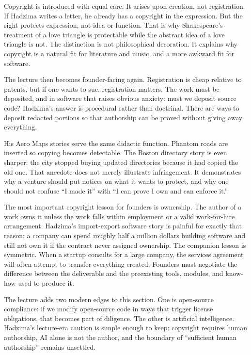 Copyright is introduced with equal care. It arises upon creation, not registration. If Hadzima writes a letter, he already has a copyright in the expression. But the right protects expression, not idea or function. That is why Shakespeare's treatment of a love triangle is protectable while the abstract idea of a love triangle is not. The distinction is not philosophical decoration. It explains why copyright is a natural fit for literature and music, and a more awkward fit for software.

The lecture then becomes founder-facing again. Registration is cheap relative to patents, but if one wants to sue, registration matters. The work must be deposited, and in software that raises obvious anxiety: must we deposit source code? Hadzima's answer is procedural rather than doctrinal. There are ways to deposit redacted portions so that authorship can be proved without giving away everything.

His Aero Maps stories serve the same didactic function. Phantom roads are inserted so copying becomes detectable. The Boston directory story is even sharper: the city stopped buying updated directories because it had copied the old one. That anecdote does not merely illustrate infringement. It demonstrates why a venture should put notices on what it wants to protect, and why one should not confuse ``I made it'' with ``I can prove I own and can enforce it.''

The most important copyright lesson for founders is ownership. The author of a work owns it unless the work falls within employment or a valid work-for-hire arrangement. Hadzima's import-export software story is painful for exactly that reason: a company can spend roughly half a million dollars building software and still not own it if the contract never assigned ownership. The companion lesson is symmetric. When a startup consults for a large company, the services agreement will often attempt to transfer everything created. Founders must negotiate the difference between the deliverable and the preexisting tools, modules, and know-how used to produce it.

The lecture adds two modern edges to this section. One is open-source compliance: if we modify open-source code in ways that trigger license obligations, that becomes part of diligence. The other is artificial intelligence. Hadzima's lecture-era caution is simple enough to keep: copyright requires human authorship, AI alone is not the author, and the boundary of ``sufficient human authorship'' remains unsettled.

